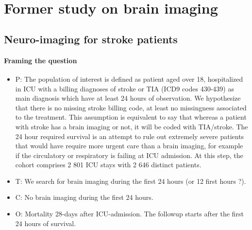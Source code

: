 
\section{Former study on brain imaging}


\subsection{Neuro-imaging for stroke patients}
\paragraph{Framing the question}

\begin{itemize}
  \item P: The population of interest is defined as patient aged over 18, hospitalized
        in ICU with a billing diagnoses of stroke or TIA (ICD9 codes 430-439) as main diagnosis which have
        at least 24 hours of observation. We hypothesize that there is no missing stroke
        billing code, at least no missingness associated to the treatment. This assumption
        is equivalent to say that whereas a patient with stroke has a brain imaging or
        not, it will be coded with TIA/stroke.  The 24 hour
        required survival is an attempt to rule out extremely severe patients that would
        have require more urgent care than a brain imaging, for example if the
        circulatory or respiratory is failing at ICU admission.
        At this step, the cohort comprises 2 801 ICU stays with 2 646 distinct patients.
  \item T: We search for brain imaging during the first 24 hours (or 12 first hours ?).
  \item C: No brain imaging during the first 24 hours.
  \item O: Mortality 28-days after ICU-admission. The followup starts after the
        first 24 hours of survival.
\end{itemize}

